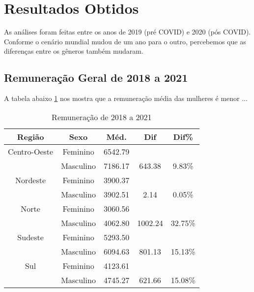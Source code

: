 \section{Resultados Obtidos}

As análises foram feitas entre os anos de 2019 (pré COVID) e 2020 (pós COVID). Conforme o cenário mundial mudou de um ano para o outro, percebemos que as diferenças entre os gêneros também mudaram.

\subsection{Remuneração Geral de 2018 a 2021}

A tabela abaixo \ref{remunTotal} nos mostra que a remuneração média das mulheres é menor ...

\begin{table}[htbp]
	\caption{Remuneração de 2018 a 2021}
	\begin{center}
		\begin{tabular}{|c|c|c|c|c|}
			\hline
			\textbf{Região} & \textbf{Sexo} & \textbf{Méd.} & \textbf{Dif} & \textbf{Dif\%} \\ 
			\hline																			
																																																																	
			Centro-Oeste     & Feminino      & 6542.79        &              &                \\ 
			                 & Masculino     & 7186.17        & 643.38       & 9.83\%         \\ \hline
			Nordeste         & Feminino      & 3900.37        &              &                \\ 
			                 & Masculino     & 3902.51        & 2.14         & 0.05\%         \\ \hline
			Norte            & Feminino      & 3060.56        &              &                \\ 
			                 & Masculino     & 4062.80        & 1002.24      & 32.75\%        \\ \hline
			Sudeste          & Feminino      & 5293.50        &              &                \\ 
			                 & Masculino     & 6094.63        & 801.13       & 15.13\%        \\ \hline
			Sul              & Feminino      & 4123.61        &              &                \\ 
			                 & Masculino     & 4745.27        & 621.66       & 15.08\%        \\ 
			\hline
		\end{tabular}
		\label{remunTotal}
	\end{center}
\end{table}


